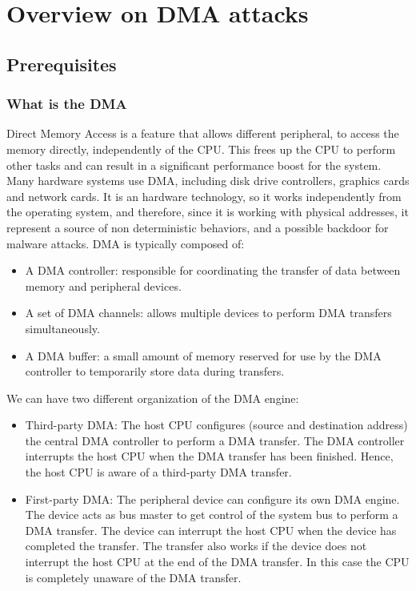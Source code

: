 \chapter{Overview on DMA attacks} \label{CH_intro}
\section{Prerequisites}
\subsection{What is the DMA}
Direct Memory Access is a feature that allows different peripheral, to access the memory directly, independently of the CPU. This frees up the CPU to perform other tasks and can result in a significant performance boost for the system. Many hardware systems use DMA, including disk drive controllers, graphics cards and network cards. It is an hardware technology, so it works independently from the operating system, and therefore,  since it is working with physical addresses, it represent a source of non deterministic behaviors, and a possible backdoor for malware attacks.
DMA is typically composed of:
\begin{itemize}
    \item  A DMA controller: responsible for coordinating the transfer of data between memory and peripheral devices.
\item A set of DMA channels: allows multiple devices to perform DMA transfers simultaneously.
\item A DMA buffer: a small amount of memory reserved for use by the DMA controller to temporarily store data during transfers.
\end{itemize}

We can have two different organization of the DMA engine:
\begin{itemize}
    \item Third-party DMA: The host CPU configures (source and destination
address) the central DMA controller to perform a DMA transfer. The DMA controller interrupts the host CPU when the DMA transfer has been finished.
Hence, the host CPU is aware of a third-party DMA transfer. 
\item First-party DMA: The peripheral device can configure its own DMA engine. The device acts as bus master to get control of the system bus to perform a DMA transfer. The device can interrupt the host CPU when the device has completed the transfer. The transfer also works if the device does not interrupt the host CPU at the end of the DMA transfer. In this case the CPU is completely unaware of the DMA transfer.
\end{itemize}


